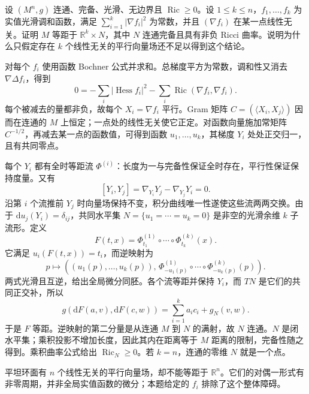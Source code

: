 \begin{optionalexercise}\label{g3:ex:several-harmonic-functions-splitting}
	设 \((M^n,g)\) 连通、完备、光滑、无边界且 \(\operatorname{Ric}\ge0\)。设 \(1\le k\le n\)，\(f_1,\ldots,f_k\) 为实值光滑调和函数，满足 \(\sum_{i=1}^k|\nabla f_i|^2\) 为常数，并且 \((\nabla f_i)\) 在某一点线性无关。证明 \(M\) 等距于 \(\mathbb R^k\times N\)，其中 \(N\) 连通完备且具有非负 Ricci 曲率。说明为什么只假定存在 \(k\) 个线性无关的平行向量场还不足以得到这个结论。
\end{optionalexercise}
\begin{solution}
	对每个 \(f_i\) 使用函数 Bochner 公式并求和。总梯度平方为常数，调和性又消去 \(\nabla\Delta f_i\)，得到
	\[
		0=-\sum_i|\operatorname{Hess}f_i|^2
		-\sum_i\operatorname{Ric}(\nabla f_i,\nabla f_i).
	\]
	每个被减去的量都非负，故每个 \(X_i=\nabla f_i\) 平行。Gram 矩阵 \(C=(\langle X_i,X_j\rangle)\) 因而在连通的 \(M\) 上恒定；一点处的线性无关使它正定。对函数向量施加常矩阵 \(C^{-1/2}\)，再减去某一点的函数值，可得到函数 \(u_1,\ldots,u_k\)，其梯度 \(Y_i\) 处处正交归一，且有共同零点。

	每个 \(Y_i\) 都有全时等距流 \(\Phi^{(i)}\)：长度为一与完备性保证全时存在，平行性保证保持度量。又有
	\[
		[Y_i,Y_j]=\nabla_{Y_i}Y_j-\nabla_{Y_j}Y_i=0.
	\]
	沿第 \(i\) 个流推前 \(Y_j\) 时向量场保持不变，积分曲线唯一性遂使这些流两两交换。由于 \(\mathrm du_j(Y_i)=\delta_{ij}\)，共同水平集
	\(N=\{u_1=\cdots=u_k=0\}\) 是非空的光滑余维 \(k\) 子流形。定义
	\[
		F(t,x)=\Phi_{t_1}^{(1)}\circ\cdots\circ\Phi_{t_k}^{(k)}(x).
	\]
	它满足 \(u_i(F(t,x))=t_i\)，而逆映射为
	\[
		p\longmapsto\left(
		(u_1(p),\ldots,u_k(p)),\,
		\Phi_{-u_1(p)}^{(1)}\circ\cdots\circ
		\Phi_{-u_k(p)}^{(k)}(p)\right).
	\]
	两式光滑且互逆，给出全局微分同胚。各个流等距并保持 \(Y_i\)，而 \(TN\) 是它们的共同正交补，所以
	\[
		g(\mathrm dF(a,v),\mathrm dF(c,w))
		=\sum_{i=1}^k a_ic_i+g_N(v,w).
	\]
	于是 \(F\) 等距。逆映射的第二分量是从连通 \(M\) 到 \(N\) 的满射，故 \(N\) 连通。\(N\) 是闭水平集；乘积投影不增加长度，因此其内在距离等于 \(M\) 距离的限制，完备性随之得到。乘积曲率公式给出 \(\operatorname{Ric}_N\ge0\)。若 \(k=n\)，连通的零维 \(N\) 就是一个点。

	平坦环面有 \(n\) 个线性无关的平行向量场，却不能等距于 \(\mathbb R^n\)。它们的对偶一形式有非零周期，并非全局实值函数的微分；本题给定的 \(f_i\) 排除了这个整体障碍。
\end{solution}

